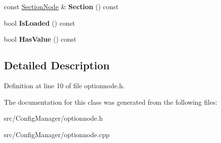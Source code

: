 \begin{DoxyCompactItemize}
\item 
const \hyperlink{class_config_manager_1_1_section_node}{Section\+Node} \& {\bfseries Section} () const \hypertarget{class_config_manager_1_1_option_node_a5f04016950d1b512d1b3efad7558da13}{}\label{class_config_manager_1_1_option_node_a5f04016950d1b512d1b3efad7558da13}

\item 
bool {\bfseries Is\+Loaded} () const \hypertarget{class_config_manager_1_1_option_node_a5c0a779da4931dab931cef2d9f9b1d70}{}\label{class_config_manager_1_1_option_node_a5c0a779da4931dab931cef2d9f9b1d70}

\item 
bool {\bfseries Has\+Value} () const \hypertarget{class_config_manager_1_1_option_node_acc9389da929330b79e78a8dcb6c66f11}{}\label{class_config_manager_1_1_option_node_acc9389da929330b79e78a8dcb6c66f11}

\end{DoxyCompactItemize}


\subsection{Detailed Description}


Definition at line 10 of file optionnode.\+h.



The documentation for this class was generated from the following files\+:\begin{DoxyCompactItemize}
\item 
src/\+Config\+Manager/optionnode.\+h\item 
src/\+Config\+Manager/optionnode.\+cpp\end{DoxyCompactItemize}
